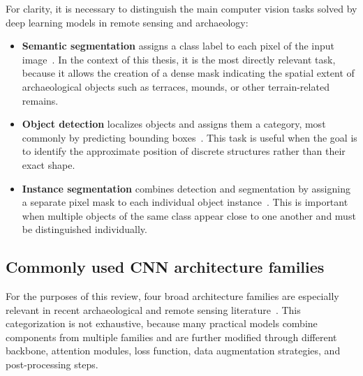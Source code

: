 For clarity, it is necessary to distinguish the main computer vision tasks solved by deep learning models in remote sensing and archaeology:
\begin{itemize}
    \item \textbf{Semantic segmentation} assigns a class label to each pixel of the input image~\cite{cui_semantic_2020,chen_geographic_2018}. In the context of this thesis, it is the most directly relevant task, because it allows the creation of a dense mask indicating the spatial extent of archaeological objects such as terraces, mounds, or other terrain-related remains.
    \item \textbf{Object detection} localizes objects and assigns them a category, most commonly by predicting bounding boxes~\cite{fiorucci_deep_2022,azarkhordad_detecting_2025}. This task is useful when the goal is to identify the approximate position of discrete structures rather than their exact shape.
    \item \textbf{Instance segmentation} combines detection and segmentation by assigning a separate pixel mask to each individual object instance~\cite{bundzel_semantic_2020,guyot_objective_2021}. This is important when multiple objects of the same class appear close to one another and must be distinguished individually.
\end{itemize}

\subsection{Commonly used CNN architecture families}
For the purposes of this review, four broad architecture families are especially relevant in recent archaeological and remote sensing literature~\cite{fiorucci_deep_2022,zhang_unveiling_2024}. This categorization is not exhaustive, because many practical models combine components from multiple families and are further modified through different backbone, attention modules, loss function, data augmentation strategies, and post-processing steps.

